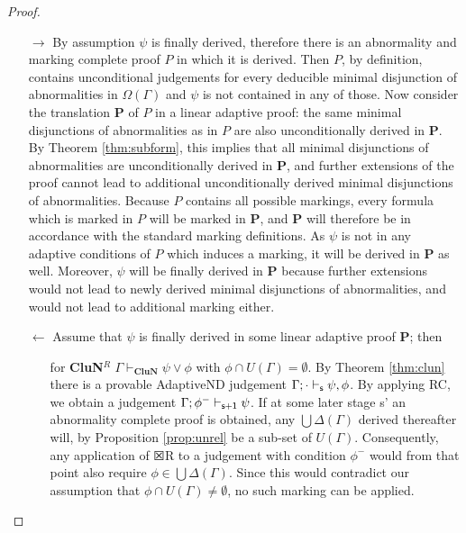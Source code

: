 \documentclass[]{article}
\newcommand{\Turn}[2]
    { {#1}\vdash_{\textbf{\sf s}}  {#2}}
\newcommand{\TurnNext}[2]
        { {#1}\vdash_{\textbf{\sf s+1}}  {#2}}
\begin{document}
\begin{proof}

\begin{itemize}
\item[$\rightarrow$] By assumption $\psi$ is finally derived, therefore there is an abnormality and marking complete proof $P$ in which it is derived. Then $P$, by definition, contains unconditional judgements for every deducible minimal disjunction of abnormalities in $\Omega(\Gamma)$ and $\psi$ is not contained in any of those. Now consider the translation $\mathbf{P}$ of $P$ in a linear adaptive proof: the same minimal disjunctions of abnormalities as in $P$ are also unconditionally derived in $\mathbf{P}$. By Theorem \ref{thm:subform}, this implies that all minimal disjunctions of abnormalities are unconditionally derived in $\mathbf{P}$, and further extensions of the proof cannot lead to additional unconditionally derived minimal disjunctions of abnormalities. Because $P$ contains all possible markings, every formula which is marked in $P$ will be marked in $\mathbf{P}$, and $\mathbf{P}$ will therefore be in accordance with the standard marking definitions. As $\psi$ is not in any adaptive conditions of $P$ which induces a marking, it will be derived in $\mathbf{P}$ as well. Moreover, $\psi$ will be finally derived in $\mathbf{P}$ because further extensions would not lead to newly derived minimal disjunctions of abnormalities, and would not lead to additional marking either.

\item[$\leftarrow$] Assume that $\psi$ is finally derived in some linear adaptive proof $\mathbf{P}$; then


\begin{itemize}
  \item[for \textbf{CluN}$^{R}$]  $\Gamma\vdash_{\mathbf{CluN}}\psi\vee \phi$ with $\phi\cap U(\Gamma)=\emptyset$. By Theorem \ref{thm:clun} there is a provable {\sf AdaptiveND} judgement $\Turn{\Gamma;\cdot}{\psi,\phi}$. By applying {\sf RC}, we obtain a judgement
  $\TurnNext{\Gamma;\phi^{-}}{\psi}$. If at some later stage {\sf s'} an abnormality complete proof is obtained, any $\bigcup \Delta (\Gamma)$ derived thereafter will, by Proposition \ref{prop:unrel} be a sub-set of $U(\Gamma)$. Consequently, any application of $\XBox$R to a judgement with condition $\phi^-$ would from that point also require $\phi \in \bigcup \Delta (\Gamma)$. Since this would contradict our assumption that $\phi\cap U(\Gamma)\neq\emptyset$, no such marking can be applied.


\end{itemize}
\end{itemize}
\end{proof}
\end{document}

